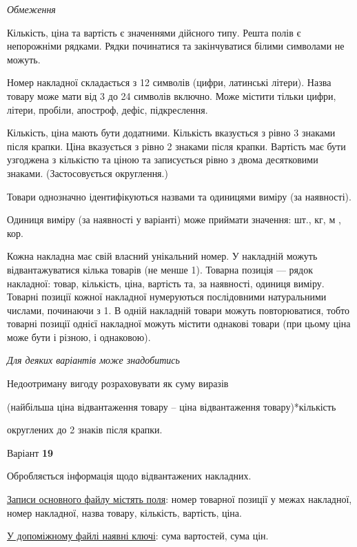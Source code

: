 \documentclass[11pt, ukrainian]{article}
\begin{document}

\bigskip\textit{Обмеження}

Кількість, ціна та вартість є значеннями дійсного типу.
Решта полів є непорожніми рядками.
Рядки починатися та закінчуватися білими символами не можуть.

Номер накладної складається з 12 символів (цифри, латинські літери).
Назва товару може мати від 3 до 24 символів включно.
Може містити тільки цифри, літери, пробіли, апостроф, дефіс, підкреслення.

Кількість, ціна мають бути додатними.
Кількість вказується з рівно 3 знаками після крапки.
Ціна вказується з рівно 2 знаками після крапки.
Вартість має бути узгоджена з кількістю та ціною та записується рівно з двома десятковими знаками.
(Застосовується округлення.)

Товари однозначно ідентифікуються назвами та одиницями виміру (за наявності).

Одиниця виміру (за наявності у варіанті) може приймати значення: шт., кг, м , кор.

Кожна накладна має свій власний унікальний номер.
У накладній можуть відвантажуватися кілька товарів (не менше 1).
Товарна позиція --- рядок накладної: товар, кількість, ціна, вартість та, за наявності, одиниця виміру.
Товарні позиції кожної накладної нумеруються послідовними натуральними числами, починаючи з 1.
В одній накладній товари можуть повторюватися, 
тобто товарні позиції однієї накладної можуть містити однакові товари 
(при цьому ціна може бути і різною, і однаковою).

\bigskip\textit{Для деяких варіантів може знадобитись}

Недоотриману вигоду розраховувати як суму виразів
{\center (найбільша ціна відвантаження товару – ціна відвантаження товару)*кількість\par}

\bigskip
{\noindent} округлених до 2 знаків після крапки.


\par
\newpage
{\center Варіант  \No \textbf { 19 }\par}
\bigskip
Обробляється інформація щодо відвантажених накладних.

\underline{Записи основного файлу містять поля}: номер товарної позиції у межах накладної, номер накладної, назва товару, кількість, вартість, ціна.

\underline{У допоміжному файлі наявні ключі}: сума вартостей, сума цін.
\end{document}
